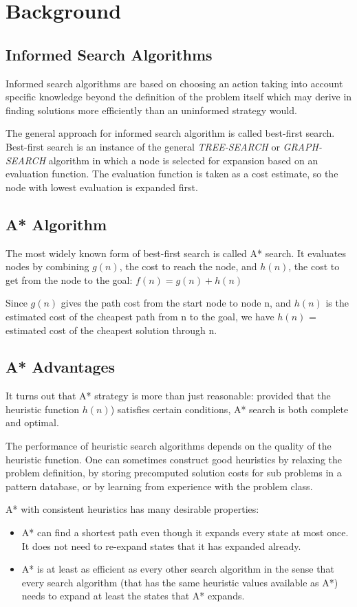 \chapter{Background}
\setlength{\parskip}{1em}
\section{Informed Search Algorithms}
Informed search algorithms are based on choosing an action taking into account specific knowledge beyond the definition of the problem itself which may derive in finding solutions more efficiently than an uninformed strategy would.

The general approach for informed search algorithm is called best-first search. Best-first search is an instance of the general {\textit{TREE-SEARCH}} or {\textit{GRAPH-SEARCH}} algorithm in which a node is selected for expansion based on an evaluation function.  The evaluation function is taken as a cost estimate, so the node with lowest evaluation is expanded first. 

\section{A* Algorithm}
The most widely known form of best-first search is called A* search. It evaluates nodes by combining \(g(n)\), the cost to reach the node, and \(h(n)\), the cost to get from the node to the goal: 
\(f(n)=g(n) + h(n)\)

Since \(g(n)\) gives the path cost from the start node to node n, and \(h(n)\) is the estimated cost of the cheapest path from n to the goal, we have
\(h(n)\) = estimated cost of the cheapest solution through n.

\section{A* Advantages}
It turns out that A* strategy is more than just reasonable: provided that the heuristic function \(h(n)\)) satisfies certain conditions, A* search is both complete and optimal.

The performance of heuristic search algorithms depends on the quality of the heuristic function. One can sometimes construct good heuristics by relaxing the problem definition, by storing precomputed solution costs for sub problems in a pattern database, or by learning from experience with the problem class.

A* with consistent heuristics has many desirable properties: 

\begin{itemize}
  \item A* can find a shortest path even though it expands every state at most once. It does not need to re-expand states that it has expanded already. 
  \item A* is at least as efficient as every other search algorithm in the sense that every search algorithm (that has the same heuristic values available as A*) needs to expand at least the states that A* expands.
\end{itemize}

